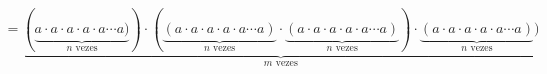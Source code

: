 \documentclass[preview]{standalone}
\begin{document}
\begin{align*}
=\underbrace{(\underbrace{a \cdot a \cdot a \cdot a \cdot a \cdots a)}_{n \text{ vezes}})\cdot(\underbrace{(a \cdot a \cdot a \cdot a \cdot a \cdots a)}_{n \text{ vezes}}\cdot\underbrace{(a \cdot a \cdot a \cdot a \cdot a \cdots a)}_{n \text{ vezes}})\cdot\underbrace{(a \cdot a \cdot a \cdot a \cdot a \cdots a)}_{n \text{ vezes}})}_{m \text{ vezes}}
\end{align*}
\end{document}
